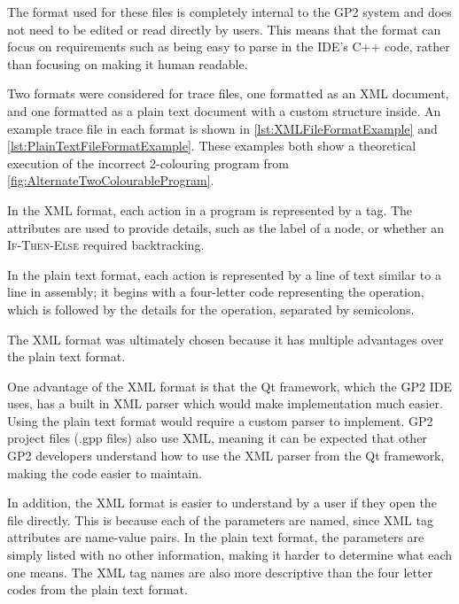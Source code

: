 \documentclass[authoryearcitations]{UoYCSproject}
\newcommand{\includecode}[4][c]{}
\begin{document}
The format used for these files is completely internal to the GP2 system and
does not need to be edited or read directly by users. This means that the format
can focus on requirements such as being easy to parse in the IDE's C++ code,
rather than focusing on making it human readable.

Two formats were considered for trace files, one formatted as an XML document,
and one formatted as a plain text document with a custom structure inside. An
example trace file in each format is shown in \autoref{lst:XMLFileFormatExample}
and \autoref{lst:PlainTextFileFormatExample}. These examples both show a
theoretical execution of the incorrect 2-colouring program from
\autoref{fig:AlternateTwoColourableProgram}.

\includecode[xml]{CodeSnippets/xmltraceexample.xml}{XML based trace file example}{lst:XMLFileFormatExample}

\clearpage

\includecode{CodeSnippets/plaintraceexample.txt}{Plain text trace file example}{lst:PlainTextFileFormatExample}

In the XML format, each action in a program is represented by a tag. The
attributes are used to provide details, such as the label of a node, or whether
an \textsc{If-Then-Else} required backtracking.

In the plain text format, each action is represented by a line of text similar
to a line in assembly; it begins with a four-letter code representing the
operation, which is followed by the details for the operation, separated by
semicolons.

The XML format was ultimately chosen because it has multiple advantages over the
plain text format.

One advantage of the XML format is that the Qt framework, which the GP2 IDE uses,
has a built in XML parser which would make implementation much easier. Using the
plain text format would require a custom parser to implement. GP2 project files
(.gpp files) also use XML, meaning it can be expected that other GP2 developers
understand how to use the XML parser from the Qt framework, making the code
easier to maintain.

In addition, the XML format is easier to understand by a user if they open the
file directly. This is because each of the parameters are named, since XML tag
attributes are name-value pairs. In the plain text format, the parameters are
simply listed with no other information, making it harder to determine what
each one means. The XML tag names are also more descriptive than the four letter
codes from the plain text format.
\end{document}
